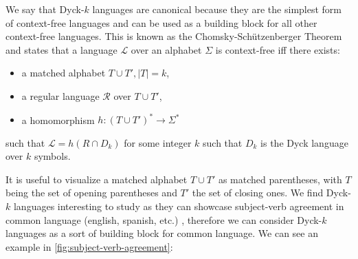 We say that Dyck-$k$ languages are canonical because they are the simplest form of context-free languages and can be used as a building block 
for all other context-free languages. This is known as the Chomsky-Sch{\"u}tzenberger Theorem \cite{rozenberg1997handbook} and states that a language $\mathcal{L}$ over an alphabet $\Sigma$ is context-free iff there exists:
\begin{itemize}
    \item a matched alphabet $T \cup T', |T| = k$,
    \item a regular language $\mathcal{R}$ over $T \cup T'$,
    \item a homomorphism $h: {(T \cup T')}^* \rightarrow \Sigma^*$
\end{itemize}

such that $\mathcal{L} = h(R \cap D_k)$ for some integer $k$ such that $D_k$ is the Dyck language over $k$ symbols.

It is useful to visualize a matched alphabet  $T \cup T'$ as matched parentheses, with $T$ being the set of opening parentheses and $T'$ the set of closing ones.
\newpage
We find Dyck-$k$ languages interesting to study as they can showcase subject-verb agreement in common language (english, spanish, etc.) \cite{bounded-hierarchical-languages}, therefore we can consider Dyck-$k$ languages as a sort of building block for common language. We can see an example in \ref{fig:subject-verb-agreement}:

